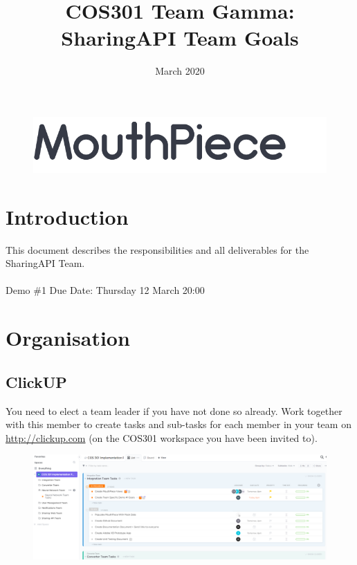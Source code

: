 \documentclass{article}
\begin{document}
\title{COS301 Team Gamma: SharingAPI Team Goals}
\begin{figure}
    \centering
    \includegraphics[width=\textwidth]{logo.png}
\end{figure}
\date{March 2020}

\maketitle

\section{Introduction}
This document describes the responsibilities and all deliverables for the \\SharingAPI Team.
\\ \\
Demo \#1 Due Date: Thursday 12 March 20:00
\newpage

\section{Organisation}
\subsection{ClickUP}
You need to elect a team leader if you have not done so already. Work together with this member to create tasks and sub-tasks for each member in your team on \url{http://clickup.com} (on the COS301 workspace you have been invited to). \\

\begin{figure}[h]
    \centering
    \includegraphics[width=\textwidth]{clickup.png}
\end{figure}
\end{document}
